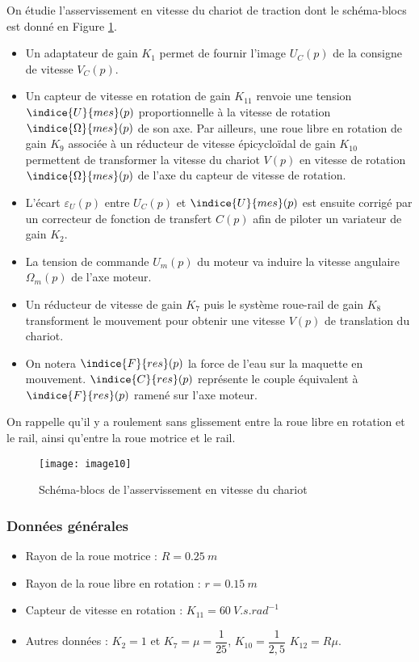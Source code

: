 On étudie l'asservissement en vitesse du chariot de traction dont le schéma-blocs est donné en Figure \ref{fig:CCMP:2021:10}.

\begin{itemize}
\item Un adaptateur de gain $K_1$ permet de fournir l'image $U_C (p)$ de la consigne de vitesse $V_C (p)$.
\item Un capteur de vitesse en rotation de gain $K_{11}$ renvoie une tension $\indice{U}{mes}(p)$ proportionnelle à la vitesse de rotation $\indice{\Omega}{mes} (p)$ de son axe. Par ailleurs, une roue libre en rotation de gain $K_9$ associée à un réducteur de vitesse épicycloïdal de gain $K_10$ permettent de transformer la vitesse du chariot $V(p)$ en vitesse de rotation $\indice{\Omega}{mes} (p)$ de l'axe du capteur de vitesse de rotation.
\item L'écart $\varepsilon_U (p)$ entre $U_C (p)$ et $\indice{U}{mes} (p)$ est ensuite corrigé par un correcteur de fonction de transfert $C(p)$ afin de piloter un variateur de gain $K_2$.
\item La tension de commande $U_m (p)$ du moteur va induire la vitesse angulaire $\Omega_m (p)$ de l'axe moteur.
\item Un réducteur de vitesse de gain $K_7$ puis le système roue-rail de gain $K_8$ transforment le mouvement pour obtenir une vitesse $V(p)$ de translation du chariot.
\item On notera $\indice{F}{res} (p)$ la force de l'eau sur la maquette en mouvement. $\indice{C}{res} (p)$ représente le couple équivalent à $\indice{F}{res} (p)$ ramené sur l'axe moteur.
\end{itemize}
On rappelle qu'il y a roulement sans glissement entre la roue libre en rotation et le rail, ainsi qu’entre la roue motrice et le rail.
 
\begin{figure}[!h]
\centering
\texttt{[image: image10]}
\caption{ \label{fig:CCMP:2021:10} Schéma-blocs de l'asservissement en vitesse du chariot}
\end{figure} 

\subsubsection*{Données générales}
 
 \begin{itemize}
\item Rayon de la roue motrice :	$R=\SI{0,25}{m}$
\item Rayon de la roue libre en rotation : $r=\SI{0,15}{m}$
\item Capteur de vitesse en rotation : $K_{11}=\SI{60}{V.s.rad^{-1}}$
\item Autres données : $K_2=1$ et $K_7=\mu=\dfrac{1}{25}$, $K_10=\dfrac{1}{2,5}$	$K_{12}=R\mu$.
 \end{itemize}
 
